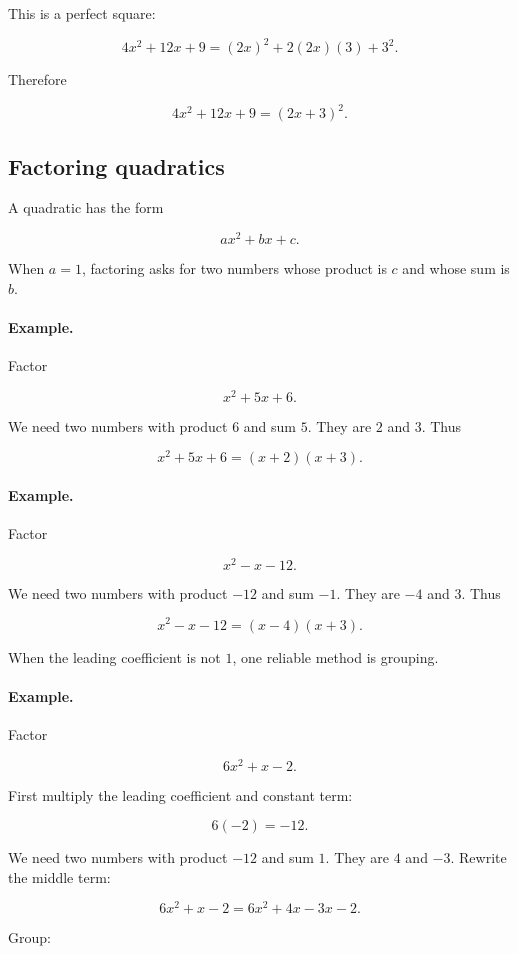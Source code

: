This is a perfect square:

\[
4x^2+12x+9=(2x)^2+2(2x)(3)+3^2.
\]

Therefore

\[
\boxed{
4x^2+12x+9=(2x+3)^2.
}
\]

\subsection{Factoring quadratics}
\label{appsubsec:factoring-quadratics}

A quadratic has the form

\[
ax^2+bx+c.
\]

When \(a=1\), factoring asks for two numbers whose product is \(c\) and whose sum is
\(b\).

\paragraph{Example.}
Factor

\[
x^2+5x+6.
\]

We need two numbers with product \(6\) and sum \(5\).  They are \(2\) and \(3\).
Thus

\[
\boxed{
x^2+5x+6=(x+2)(x+3).
}
\]

\paragraph{Example.}
Factor

\[
x^2-x-12.
\]

We need two numbers with product \(-12\) and sum \(-1\).  They are \(-4\) and \(3\).
Thus

\[
\boxed{
x^2-x-12=(x-4)(x+3).
}
\]

When the leading coefficient is not \(1\), one reliable method is grouping.

\paragraph{Example.}
Factor

\[
6x^2+x-2.
\]

First multiply the leading coefficient and constant term:

\[
6(-2)=-12.
\]

We need two numbers with product \(-12\) and sum \(1\).  They are \(4\) and \(-3\).
Rewrite the middle term:

\[
6x^2+x-2=6x^2+4x-3x-2.
\]

Group:


